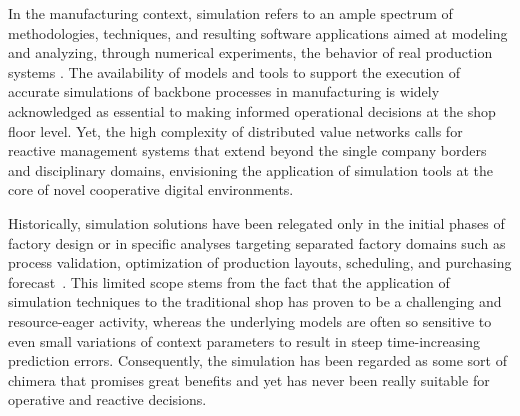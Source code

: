 In the manufacturing context, simulation refers to an ample spectrum of methodologies, techniques, and resulting software applications aimed at modeling and analyzing, through numerical experiments, the behavior of real production systems \cite{chung2003simulation, bangsow2010manufacturing}. 
The availability of models and tools to support the execution of accurate simulations of backbone processes in manufacturing is widely acknowledged as essential to making informed operational decisions at the shop floor level. 
Yet, the high complexity of distributed value networks calls for reactive management systems that extend beyond the single company borders and disciplinary domains, envisioning the application of simulation tools at the core of novel cooperative digital environments. 

Historically, simulation solutions have been relegated only in the initial phases of factory design or in specific analyses targeting separated factory domains such as process validation, optimization of production layouts, scheduling, and purchasing forecast~\cite{fowler2004grand}.
This limited scope stems from the fact that the application of simulation techniques to the traditional shop has proven to be a challenging and resource-eager activity, whereas the underlying models are often so sensitive to even small variations of context parameters to result in steep time-increasing prediction errors. 
Consequently, the simulation has been regarded as some sort of chimera that promises great benefits and yet has never been really suitable for operative and reactive decisions. 

